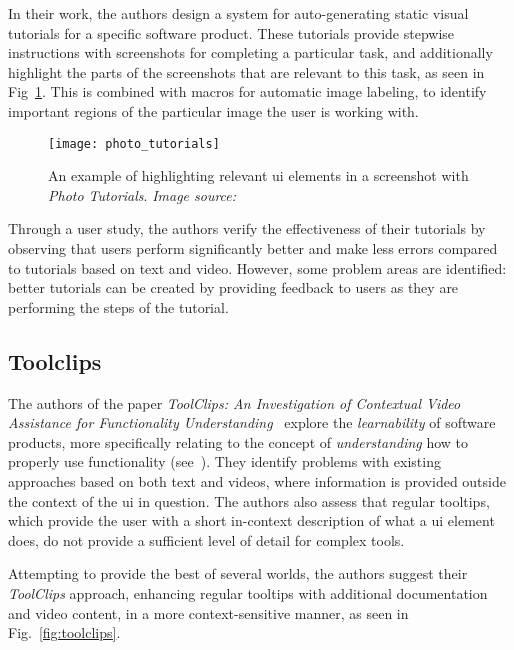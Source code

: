 \noindent
In their work, the authors design a system for auto-generating static visual tutorials for a specific software product. These tutorials provide stepwise instructions with screenshots for completing a particular task, and additionally highlight the parts of the screenshots that are relevant to this task, as seen in Fig~\ref{fig:photo_tutorials}. This is combined with macros for automatic image labeling, to identify important regions of the particular image the user is working with.

\begin{figure}[htp]
	\centering
	\texttt{[image: photo\_tutorials]}
	\caption[\emph{Photo Tutorials} example]{An example of highlighting relevant \gls{ui} elements in a screenshot with \emph{Photo Tutorials}. \emph{Image source:~\cite{grabler:photo_tutorials}}}
	\label{fig:photo_tutorials}
\end{figure}

\noindent
Through a user study, the authors verify the effectiveness of their tutorials by observing that users perform significantly better and make less errors compared to tutorials based on text and video. However, some problem areas are identified: better tutorials can be created by providing feedback to users as they are performing the steps of the tutorial.

\subsection{Toolclips}
\label{sec:toolclips}
The authors of the paper \emph{ToolClips: An Investigation of Contextual
Video Assistance for Functionality Understanding}~\cite{grossman:toolclips} explore the \emph{learnability} of software products, more specifically relating to the concept of \emph{understanding} how to properly use functionality (see~\cite{grossman:software_learnability}). They identify problems with existing approaches based on both text and videos, where information is provided outside the context of the \gls{ui} in question. The authors also assess that regular tooltips, which provide the user with a short in-context description of what a \gls{ui} element does, do not provide a sufficient level of detail for complex tools.

\noindent
Attempting to provide the best of several worlds, the authors suggest their \emph{ToolClips} approach, enhancing regular tooltips with additional documentation and video content, in a more context-sensitive manner, as seen in Fig.~\ref{fig:toolclips}.

